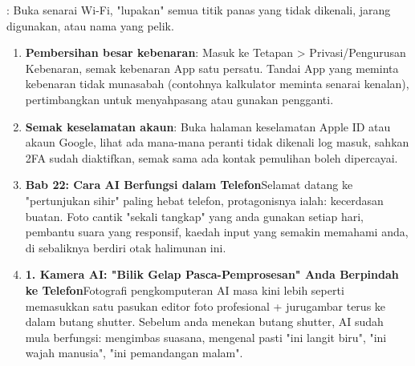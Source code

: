 \begin{tcbpractice}{: Buka senarai Wi-Fi, "lupakan" semua titik panas yang tidak dikenali, jarang digunakan, atau nama yang pelik.}
\begin{enumerate}
  \item \textbf{Pembersihan besar kebenaran}: Masuk ke Tetapan > Privasi/Pengurusan Kebenaran, semak kebenaran App satu persatu. Tandai App yang meminta kebenaran tidak munasabah (contohnya kalkulator meminta senarai kenalan), pertimbangkan untuk menyahpasang atau gunakan pengganti.
  \item \textbf{Semak keselamatan akaun}: Buka halaman keselamatan Apple ID atau akaun Google, lihat ada mana-mana peranti tidak dikenali log masuk, sahkan 2FA sudah diaktifkan, semak sama ada kontak pemulihan boleh dipercayai.
  \item \textbf{Bab 22: Cara AI Berfungsi dalam Telefon}Selamat datang ke "pertunjukan sihir" paling hebat telefon, protagonisnya ialah: kecerdasan buatan. Foto cantik "sekali tangkap" yang anda gunakan setiap hari, pembantu suara yang responsif, kaedah input yang semakin memahami anda, di sebaliknya berdiri otak halimunan ini.
  \item \textbf{1. Kamera AI: "Bilik Gelap Pasca-Pemprosesan" Anda Berpindah ke Telefon}Fotografi pengkomputeran AI masa kini lebih seperti memasukkan satu pasukan editor foto profesional + jurugambar terus ke dalam butang shutter. Sebelum anda menekan butang shutter, AI sudah mula berfungsi: mengimbas suasana, mengenal pasti "ini langit biru", "ini wajah manusia", "ini pemandangan malam".
\end{enumerate}

\end{tcbpractice}
